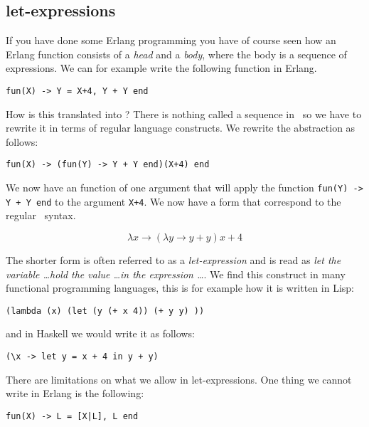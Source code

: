 \documentclass[a4paper,11pt]{article}
\begin{document}
\subsection{let-expressions}   

If you have done some Erlang programming you have of course seen how
an Erlang function consists of a {\em head} and a {\em body}, where the
body is a sequence of expressions. We can for example write the
following function in Erlang.

\vspace{10pt}
\begin{center}{\tt fun(X) ->  Y = X+4, Y + Y end}
\end{center}
\vspace{10pt}

How is this translated into \lamc? There is nothing called a sequence
in \lamc\ so we have to rewrite it in terms of regular language
constructs. We rewrite the abstraction as follows:

\vspace{10pt}
\begin{center}{\tt fun(X) -> (fun(Y) -> Y + Y end)(X+4) end}
\end{center}
\vspace{10pt}

We now have an function of one argument that will apply the
function {\tt fun(Y) -> Y + Y end} to the argument {\tt X+4}.  We
now have a form that correspond to the regular \lamc\ syntax.

$$\lambda x \rightarrow (\lambda y \rightarrow y + y) x+4$$

The shorter form is often referred to as a {\em let-expression} and is
read as {\em let the variable \ldots hold the value \ldots in the
  expression \ldots}. We find this construct in many functional
programming languages, this is for example how it is written in Lisp:
\begin{center}{\tt  (lambda (x) (let (y (+ x 4))  (+ y y) ))}
\end{center}
and in Haskell we would write it as follows:
\begin{center}{\tt  (\textbackslash x  -> let  y = x + 4  in  y + y)}
\end{center}

There are limitations on what we allow in let-expressions. One
thing we cannot write in Erlang is the following:

\begin{center}{\tt fun(X) -> L = [X|L],  L end}
\end{center}
\end{document}
